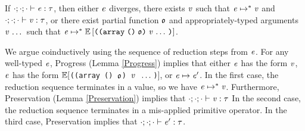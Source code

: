 \begin{theorem}
  \label{TypeSoundness}
  If $\cdot;\cdot;\cdot \vdash \mathit{e} : \mathit{\tau}$,
  then either
  $\mathit{e}$ diverges,
  there exists $\mathit{v}$ such that $\mathit{e} \mapsto^* \mathit{v}$
  and $\cdot;\cdot;\cdot \vdash \mathit{v} : \mathit{\tau}$,
  or there exist partial function $\mathfrak{o}$
  and appropriately-typed arguments $\mathit{v} \, \ldots \,$
  such that
  $\expr \mapsto^* \ctxt\left[\misapp\right]$.
\end{theorem}
\begin{sproof}[\BODY]
  We argue coinductively using the sequence of reduction steps from $\mathit{e}$.
  For any well-typed $\mathit{e}$,
  Progress (Lemma \ref{Progress}) implies that either
  $\mathit{e}$ has the form $\mathit{v}$,
  $\mathit{e}$ has the form $\mathbb{E}[${\tt ((array () $\mathfrak{o}$) $\mathit{v}$ $\, \ldots \,$)}$]$,
  or $\mathit{e} \mapsto \mathit{e}'$.
  In the first case,
  the reduction sequence terminates in a value,
  so we have $\mathit{e} \mapsto^* \mathit{v}$.
  Furthermore, Preservation (Lemma \ref{Preservation}) implies that
  $\cdot;\cdot;\cdot \vdash \mathit{v} : \mathit{\tau}$
  In the second case,
  the reduction sequence terminates in a mis-applied primitive operator.
  In the third case,
  Preservation implies that $\cdot;\cdot;\cdot \vdash \mathit{e}' : \mathit{\tau}$.
\end{sproof}
